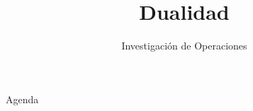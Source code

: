 \documentclass[../slides.tex]{subfiles}
\title{Dualidad}
\subtitle{Investigación de Operaciones} %
\begin{document}
\begin{frame}
  \maketitle
\end{frame}


\begin{frame}{Agenda}
  \tableofcontents
\end{frame}






\begin{frame}
  \maketitle
\end{frame}
\end{document}
